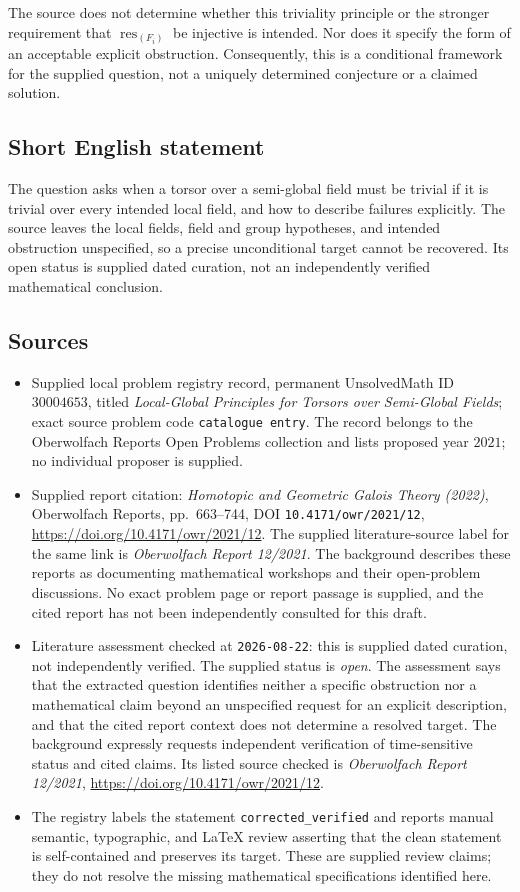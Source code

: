 \documentclass[11pt]{article}
\begin{document}
The source does not determine whether this triviality principle or the stronger requirement that \(\operatorname{res}_{(F_i)}\) be injective is intended. Nor does it specify the form of an acceptable explicit obstruction. Consequently, this is a conditional framework for the supplied question, not a uniquely determined conjecture or a claimed solution.
\subsection{Short English statement}
The question asks when a torsor over a semi-global field must be trivial if it is trivial over every intended local field, and how to describe failures explicitly. The source leaves the local fields, field and group hypotheses, and intended obstruction unspecified, so a precise unconditional target cannot be recovered. Its open status is supplied dated curation, not an independently verified mathematical conclusion.
\subsection{Sources}
\begin{itemize}
\item Supplied local problem registry record, permanent UnsolvedMath ID \(30004653\), titled \emph{Local-Global Principles for Torsors over Semi-Global Fields}; exact source problem code \texttt{catalogue entry}. The record belongs to the Oberwolfach Reports Open Problems collection and lists proposed year \(2021\); no individual proposer is supplied.
\item Supplied report citation: \emph{Homotopic and Geometric Galois Theory (2022)}, Oberwolfach Reports, pp.\ 663--744, DOI \texttt{10.4171/owr/2021/12}, \url{https://doi.org/10.4171/owr/2021/12}. The supplied literature-source label for the same link is \emph{Oberwolfach Report 12/2021}. The background describes these reports as documenting mathematical workshops and their open-problem discussions. No exact problem page or report passage is supplied, and the cited report has not been independently consulted for this draft.
\item Literature assessment checked at \texttt{2026-08-22}: this is supplied dated curation, not independently verified. The supplied status is \emph{open}. The assessment says that the extracted question identifies neither a specific obstruction nor a mathematical claim beyond an unspecified request for an explicit description, and that the cited report context does not determine a resolved target. The background expressly requests independent verification of time-sensitive status and cited claims. Its listed source checked is \emph{Oberwolfach Report 12/2021}, \url{https://doi.org/10.4171/owr/2021/12}.
\item The registry labels the statement \texttt{corrected\_verified} and reports manual semantic, typographic, and LaTeX review asserting that the clean statement is self-contained and preserves its target. These are supplied review claims; they do not resolve the missing mathematical specifications identified here.
\end{itemize}
\end{document}

